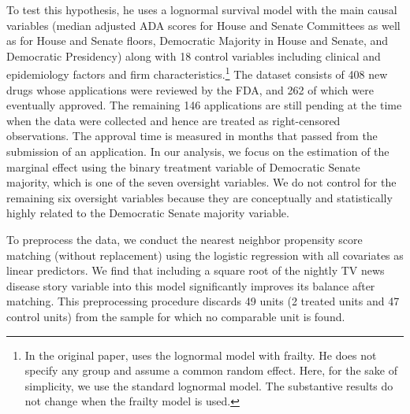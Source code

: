 \documentclass[11pt,titlepage]{article}
\begin{document}
To test this hypothesis, he uses a lognormal survival model with the
main causal variables (median adjusted ADA scores for House and Senate
Committees as well as for House and Senate floors, Democratic Majority
in House and Senate, and Democratic Presidency) along with 18 control
variables including clinical and epidemiology factors and firm
characteristics.\footnote{In the original paper, \citet{Carp02} uses
  the lognormal model with frailty. He does not specify any group and
  assume a common random effect.  Here, for the sake of simplicity, we
  use the standard lognormal model. The substantive results do not
  change when the frailty model is used.}  The dataset consists of 408
new drugs whose applications were reviewed by the FDA, and 262 of
which were eventually approved. The remaining 146 applications are
still pending at the time when the data were collected and hence are
treated as right-censored observations. The approval time is measured
in months that passed from the submission of an application.  In our
analysis, we focus on the estimation of the marginal effect using the
binary treatment variable of Democratic Senate majority, which is one
of the seven oversight variables. We do not control for the remaining
six oversight variables because they are conceptually and
statistically highly related to the Democratic Senate majority
variable.

To preprocess the data, we conduct the nearest neighbor propensity
score matching (without replacement) using the logistic regression
with all covariates as linear predictors. We find that including a
square root of the nightly TV news disease story variable into this
model significantly improves its balance after matching. This
preprocessing procedure discards 49 units (2 treated units and 47
control units) from the sample for which no comparable unit is
found. 
\end{document}
